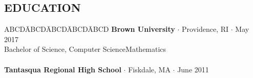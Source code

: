 \documentclass{res}
\newcommand{\myvspace}{\vspace{-0.09in}} %
\newcommand{\sectionVspace}{\vspace{-0.40in}}
\newcommand{\sbreak}{\\[-0.15in]}
\begin{document}
\begin{resume}
\myvspace
\section{EDUCATION} %
    \myvspace
    \begin{tabbing}
        ABCD\=ABCD\=ABCD\=ABCD\=ABCD\kill
        {\bf Brown University} $\cdot$ Providence, RI $\cdot$ May 2017\\
            \>Bachelor of Science, Computer Science\textemdash Mathematics\\
        \sbreak
        {\bf Tantasqua Regional High School} $\cdot$ Fiskdale, MA $\cdot$ June 2011\\
\end{tabbing}
\sectionVspace

\end{resume}
\end{document}
